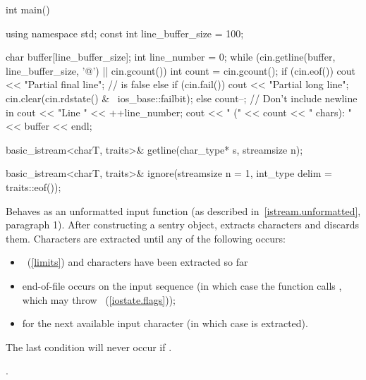 \begin{itemdescr}
\begin{example}
\begin{codeblock}
int main() {
  using namespace std;
  const int line_buffer_size = 100;

  char buffer[line_buffer_size];
  int line_number = 0;
  while (cin.getline(buffer, line_buffer_size, '@\textbackslash@n') || cin.gcount()) {
    int count = cin.gcount();
    if (cin.eof())
      cout << "Partial final line";   //  is false
    else if (cin.fail()) {
      cout << "Partial long line";
      cin.clear(cin.rdstate() & ~ios_base::failbit);
    } else {
      count--;                        // Don't include newline in 
      cout << "Line " << ++line_number;
    }
    cout << " (" << count << " chars): " << buffer << endl;
  }
}
\end{codeblock}
\end{example}
\end{itemdescr}

%
\begin{itemdecl}
basic_istream<charT, traits>& getline(char_type* s, streamsize n);
\end{itemdecl}

\begin{itemdescr}
\pnum
\returns
{}
\end{itemdescr}

%
\begin{itemdecl}
basic_istream<charT, traits>&
    ignore(streamsize n = 1, int_type delim = traits::eof());
\end{itemdecl}

\begin{itemdescr}
\pnum
\effects
Behaves as an unformatted input function
(as described in~\ref{istream.unformatted}, paragraph 1).
After constructing a sentry object, extracts
characters and discards them.
Characters are extracted until any of the following occurs:
\begin{itemize}
\item
{}~(\ref{limits})
and
 characters have been extracted so far
\item
end-of-file occurs on the input sequence
(in which case the function calls
,
which may throw
~(\ref{iostate.flags}));
\item
{}
for the next available input character 
(in which case  is extracted).
\end{itemize}

\pnum
\remarks
The last condition will never occur if
.

\pnum
\returns
{}.
\end{itemdescr}

